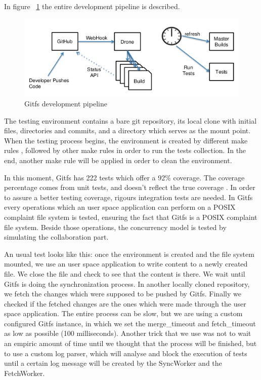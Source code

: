 In figure ~\ref{fig:pipeline} the entire development pipeline is described.

\begin{figure}[h]
  \begin{center}
    \includegraphics[width=\textwidth]{layout/drone.png}
  \end{center}
  \caption{Gitfs development pipeline \cite{GDR}}
  \label{fig:pipeline}
\end{figure}

The testing environment contains a bare git repository, its local clone with initial files, directories and commits, and a directory which serves as the mount point. When the testing process begins, the environment is created by different make rules \cite{Aham-cumming2015}, followed by other make rules in order to run the tests collection. In the end, another make rule will be applied in order to clean the environment.

In this moment, Gitfs has 222 tests which offer a 92\% coverage. The coverage percentage comes from unit tests, and doesn't reflect the true coverage \cite{Inozemtseva2014}. In order to assure a better testing coverage, rigours integration tests are needed. In Gitfs every operations which an user space application can perform on a POSIX complaint file system is tested, ensuring the fact that Gitfs is a POSIX complaint file system. Beside those operations, the concurrency model is tested by simulating the collaboration part.

An usual test looks like this: once the environment is created and the file system mounted, we use an user space application to write content to a newly created file. We close the file and check to see that the content is there. We wait until Gitfs is doing the synchronization process. In another locally cloned repository, we fetch the changes which were supposed to be pushed by Gitfs. Finally we checked if the fetched changes are the ones which were made through the user space application. The entire process can be slow, but we are using a custom configured Gitfs instance, in which we set the merge\_timeout and fetch\_timeout as low as possible (100 milliseconds). Another trick that we use was not to wait an empiric amount of time until we thought that the process will be finished, but to use a custom log parser, which will analyse and block the execution of tests until a certain log message will be created by the SyncWorker and the FetchWorker.

